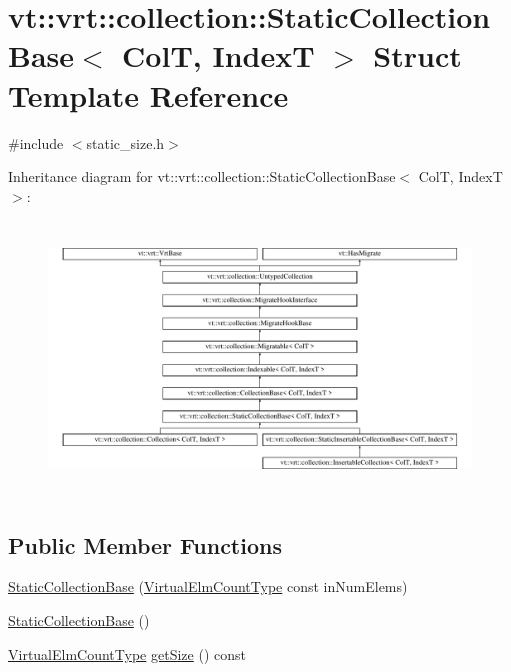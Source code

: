 \hypertarget{structvt_1_1vrt_1_1collection_1_1_static_collection_base}{}\section{vt\+:\+:vrt\+:\+:collection\+:\+:Static\+Collection\+Base$<$ ColT, IndexT $>$ Struct Template Reference}
\label{structvt_1_1vrt_1_1collection_1_1_static_collection_base}


{\ttfamily \#include $<$static\+\_\+size.\+h$>$}

Inheritance diagram for vt\+:\+:vrt\+:\+:collection\+:\+:Static\+Collection\+Base$<$ ColT, IndexT $>$\+:\begin{figure}[H]
\begin{center}
\leavevmode
\includegraphics[height=7.310705cm]{structvt_1_1vrt_1_1collection_1_1_static_collection_base}
\end{center}
\end{figure}
\subsection*{Public Member Functions}
\begin{DoxyCompactItemize}
\item 
\hyperlink{structvt_1_1vrt_1_1collection_1_1_static_collection_base_a5737915628a89a38b382ccfccbe73c40}{Static\+Collection\+Base} (\hyperlink{namespacevt_ac115668758184050beff7a9281a2c490}{Virtual\+Elm\+Count\+Type} const in\+Num\+Elems)
\item 
\hyperlink{structvt_1_1vrt_1_1collection_1_1_static_collection_base_ae304da84e3f97d1349cf9892e759efc7}{Static\+Collection\+Base} ()
\item 
\hyperlink{namespacevt_ac115668758184050beff7a9281a2c490}{Virtual\+Elm\+Count\+Type} \hyperlink{structvt_1_1vrt_1_1collection_1_1_static_collection_base_ac2858ef1bc952a6caf8fb299199aa703}{get\+Size} () const
\end{DoxyCompactItemize}
